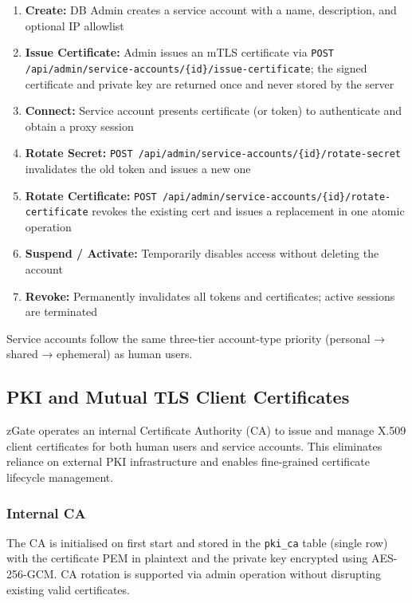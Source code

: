 \begin{enumerate}[leftmargin=*]
    \item \textbf{Create:} DB Admin creates a service account with a name, description, and optional IP allowlist
    \item \textbf{Issue Certificate:} Admin issues an mTLS certificate via \texttt{POST /api/admin/service-accounts/\{id\}/issue-certificate}; the signed certificate and private key are returned once and never stored by the server
    \item \textbf{Connect:} Service account presents certificate (or token) to authenticate and obtain a proxy session
    \item \textbf{Rotate Secret:} \texttt{POST /api/admin/service-accounts/\{id\}/rotate-secret} invalidates the old token and issues a new one
    \item \textbf{Rotate Certificate:} \texttt{POST /api/admin/service-accounts/\{id\}/rotate-certificate} revokes the existing cert and issues a replacement in one atomic operation
    \item \textbf{Suspend / Activate:} Temporarily disables access without deleting the account
    \item \textbf{Revoke:} Permanently invalidates all tokens and certificates; active sessions are terminated
\end{enumerate}

Service accounts follow the same three-tier account-type priority (personal → shared → ephemeral) as human users.

\subsection{PKI and Mutual TLS Client Certificates}
\label{subsec:pki-mtls}

zGate operates an internal Certificate Authority (CA) to issue and manage X.509 client certificates for both human users and service accounts. This eliminates reliance on external PKI infrastructure and enables fine-grained certificate lifecycle management.

\subsubsection{Internal CA}

The CA is initialised on first start and stored in the \texttt{pki\_ca} table (single row) with the certificate PEM in plaintext and the private key encrypted using AES-256-GCM. CA rotation is supported via admin operation without disrupting existing valid certificates.

